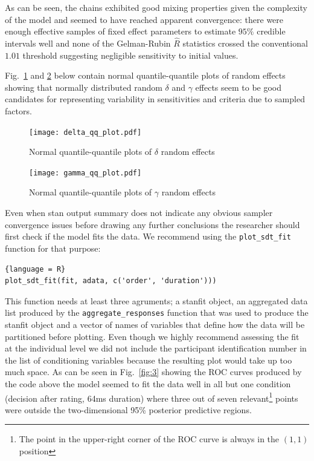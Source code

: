 \documentclass[oneside,a4paper]{article}
\begin{document}
As can be seen, the chains exhibited good mixing properties given the
complexity of the model and seemed to have reached apparent
convergence: there were enough effective samples of fixed effect
parameters to estimate $95\%$ credible intervals well and none of the
Gelman-Rubin $\hat{R}$ statistics crossed the conventional $1.01$
threshold suggesting negligible sensitivity to initial values.

Fig.~\ref{fig:6} and \ref{fig:7} below contain normal
quantile-quantile plots of random effects showing that normally
distributed random $\delta$ and $\gamma$ effects seem to be good
candidates for representing variability in sensitivities and criteria
due to sampled factors.

\begin{figure}[H]
  \centering
  \texttt{[image: delta\_qq\_plot.pdf]}
  \caption{Normal quantile-quantile plots of $\delta$ random effects}
  \label{fig:6}
\end{figure}

\begin{figure}[H]
  \centering
  \texttt{[image: gamma\_qq\_plot.pdf]}
  \caption{Normal quantile-quantile plots of $\gamma$ random effects}
  \label{fig:7}
\end{figure}

Even when stan output summary does not indicate any obvious sampler
convergence issues before drawing any further conclusions the
researcher should first check if the model fits the data. We recommend
using the \texttt{plot\_sdt\_fit} function for that purpose:

\begin{lstlisting}{language = R}
plot_sdt_fit(fit, adata, c('order', 'duration')))
\end{lstlisting}

This function needs at least three agruments; a stanfit object, an
aggregated data list produced by the \texttt{aggregate\_responses}
function that was used to produce the stanfit object and a vector of
names of variables that define how the data will be partitioned before
plotting. Even though we highly recommend assessing the fit at the
individual level we did not include the participant identification
number in the list of conditioning variables because the resulting
plot would take up too much space. As can be seen in Fig.~\ref{fig:3}
showing the ROC curves produced by the code above the model seemed to
fit the data well in all but one condition (decision after rating,
64ms duration) where three out of seven relevant\footnote{The point in
  the upper-right corner of the ROC curve is always in the $(1,1)$
  position} points were outside the two-dimensional 95\% posterior
predictive regions.
\end{document}
